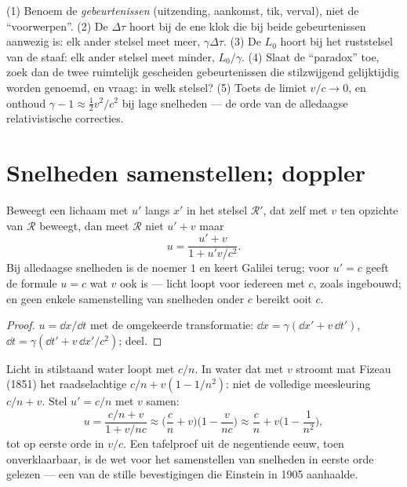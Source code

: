 \begin{method}\label{met:b3:relativistic-kinematics:method}
(1) Benoem de \emph{gebeurtenissen} (uitzending, aankomst, tik, verval),
niet de ``voorwerpen''. (2) De  $\Delta\tau$ hoort bij de ene
klok die bij beide gebeurtenissen aanwezig is: elk ander stelsel meet
meer, $\gamma\Delta\tau$. (3) De  $L_0$ hoort bij het
ruststelsel van de staaf: elk ander stelsel meet minder, $L_0/\gamma$.
(4) Slaat de ``paradox'' toe, zoek dan de twee ruimtelijk gescheiden
gebeurtenissen die stilzwijgend gelijktijdig worden genoemd, en vraag: in
welk stelsel? (5) Toets de limiet $v/c \to 0$, en onthoud $\gamma - 1 \approx \tfrac12 v^2/c^2$ bij lage snelheden --- de orde van de
alledaagse relativistische correcties.
\end{method}

\section{Snelheden samenstellen; doppler}

\begin{proposition}\label{prop:b3:relativistic-kinematics:addition}
Beweegt een lichaam met $u'$ langs $x'$ in het stelsel $\mathcal R'$, dat
zelf met $v$ ten opzichte van $\mathcal R$ beweegt, dan meet $\mathcal R$
niet $u' + v$ maar
\[
u = \frac{u' + v}{1 + u'v/c^2} .
\]
Bij alledaagse snelheden is de noemer $1$ en keert Galilei terug; voor
$u' = c$ geeft de formule $u = c$ wat $v$ ook is --- licht loopt voor
iedereen met $c$, zoals ingebouwd; en geen enkele samenstelling van
snelheden onder $c$ bereikt ooit $c$.
\end{proposition}

\begin{proof}
$u = \dd x/\dd t$ met de omgekeerde transformatie: $\dd x =
\gamma(\dd x' + v\,\dd t')$, $\dd t = \gamma(\dd t' + v\,\dd x'/c^2)$;
deel.
\end{proof}

\begin{example}\label{ex:b3:relativistic-kinematics:fizeau}
Licht in stilstaand water loopt met $c/n$. In water dat met $v$ stroomt
mat Fizeau (1851) het raadselachtige $c/n + v(1 - 1/n^2)$: niet de
volledige meesleuring $c/n + v$. Stel $u' = c/n$ met $v$ samen:
\[
u = \frac{c/n + v}{1 + v/nc}
\approx \Big(\frac{c}{n} + v\Big)\Big(1 - \frac{v}{nc}\Big)
\approx \frac{c}{n} + v\Big(1 - \frac{1}{n^2}\Big) ,
\]
tot op eerste orde in $v/c$. Een tafelproef uit de negentiende eeuw, toen
onverklaarbaar, is de wet voor het samenstellen van snelheden in eerste
orde gelezen --- een van de stille bevestigingen die Einstein in 1905
aanhaalde.
\end{example}

